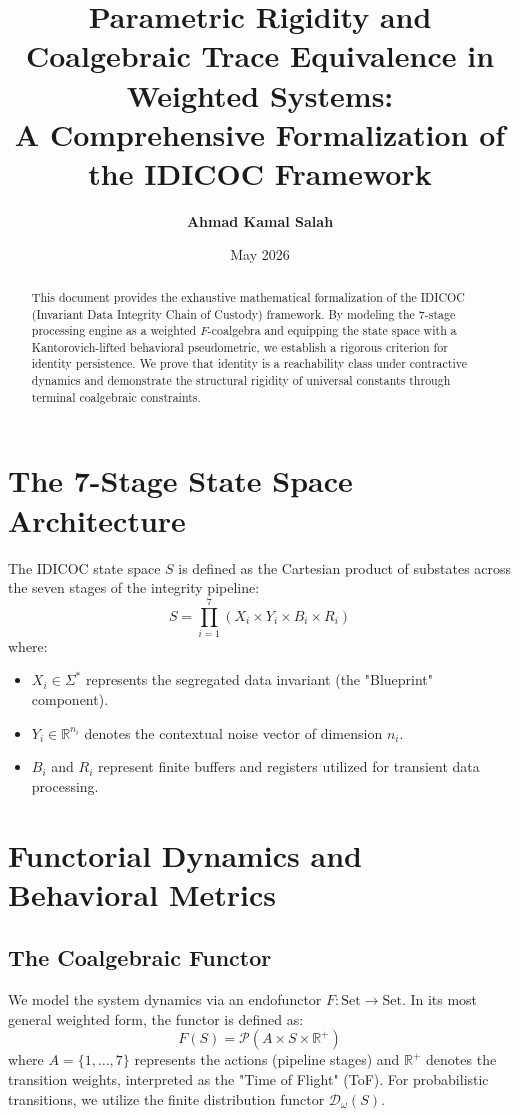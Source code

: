 \documentclass[11pt,a4paper]{article}
\title{\textbf{Parametric Rigidity and Coalgebraic Trace Equivalence in Weighted Systems: \\ A Comprehensive Formalization of the IDICOC Framework}}
\author{\textbf{Ahmad Kamal Salah}}
\date{May 2026}
\begin{document}
\maketitle

\begin{abstract}
This document provides the exhaustive mathematical formalization of the IDICOC (Invariant Data Integrity Chain of Custody) framework. By modeling the 7-stage processing engine as a weighted $F$-coalgebra and equipping the state space with a Kantorovich-lifted behavioral pseudometric, we establish a rigorous criterion for identity persistence. We prove that identity is a reachability class under contractive dynamics and demonstrate the structural rigidity of universal constants through terminal coalgebraic constraints.
\end{abstract}

\section{The 7-Stage State Space Architecture}

The IDICOC state space $S$ is defined as the Cartesian product of substates across the seven stages of the integrity pipeline:
\begin{equation}
S = \prod_{i=1}^{7} (X_i \times Y_i \times B_i \times R_i)
\end{equation}
where:
\begin{itemize}
    \item $X_i \in \Sigma^*$ represents the segregated data invariant (the "Blueprint" component).
    \item $Y_i \in \mathbb{R}^{n_i}$ denotes the contextual noise vector of dimension $n_i$.
    \item $B_i$ and $R_i$ represent finite buffers and registers utilized for transient data processing.
\end{itemize}

\section{Functorial Dynamics and Behavioral Metrics}

\subsection{The Coalgebraic Functor}
We model the system dynamics via an endofunctor $F: \text{Set} \to \text{Set}$. In its most general weighted form, the functor is defined as:
\begin{equation}
F(S) = \mathcal{P}(A \times S \times \mathbb{R}^+)
\end{equation}
where $A = \{1, \dots, 7\}$ represents the actions (pipeline stages) and $\mathbb{R}^+$ denotes the transition weights, interpreted as the "Time of Flight" (ToF). For probabilistic transitions, we utilize the finite distribution functor $\mathcal{D}_{\omega}(S)$.
\end{document}
